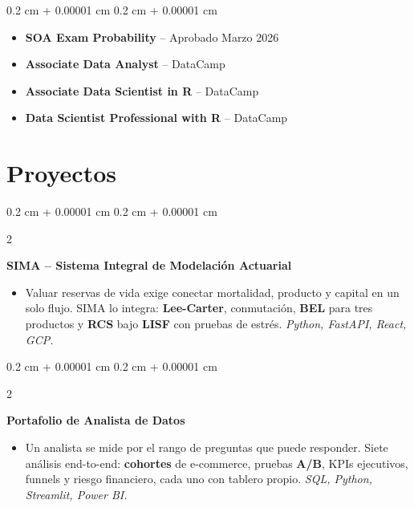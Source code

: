 \documentclass[10pt, letterpaper]{article}
\newenvironment{highlights}{
    \begin{itemize}[
        topsep=0.02 cm,
        parsep=0.05 cm,
        partopsep=0pt,
        itemsep=0pt,
        leftmargin=0.4 cm + 10pt
    ]
}{
    \end{itemize}
}
\newenvironment{highlightsforbulletentries}{
    \begin{itemize}[
        topsep=0.02 cm,
        parsep=0.02 cm,
        partopsep=0pt,
        itemsep=0pt,
        leftmargin=10pt
    ]
}{
    \end{itemize}
}
\newenvironment{onecolentry}{
    \begin{adjustwidth}{
        0.2 cm + 0.00001 cm
    }{
        0.2 cm + 0.00001 cm
    }
}{
    \end{adjustwidth}
}
\newenvironment{twocolentrynarrow}[2][]{
    \onecolentry
    \def\secondColumn{#2}
    \setcolumnwidth{\fill, 2.2 cm}
    \begin{paracol}{2}
}{
    \switchcolumn \raggedleft \secondColumn
    \end{paracol}
    \endonecolentry
}
\newcommand{\hl}[1]{\textcolor{primaryColor}{\textbf{#1}}}
\let\hrefWithoutArrow\href
\renewcommand{\href}[2]{\hrefWithoutArrow{#1}{\ifthenelse{\equal{#2}{}}{ }{#2 }\raisebox{.15ex}{\footnotesize \faExternalLink*}}}
\begin{document}
    \begin{onecolentry}
        \begin{highlightsforbulletentries}
            \item \textbf{SOA Exam Probability} -- Aprobado Marzo 2026 \href{https://drive.google.com/file/d/1rt3emgBnPpQi7NiXkBQeA5WwJTV0JuAf/view?usp=sharing}{}
            \item \textbf{Associate Data Analyst} -- DataCamp \href{https://drive.google.com/drive/folders/1-QUuVH3zPBPsl6RhUvuUWxpZkP1i8TYb?usp=sharing}{}
            \item \textbf{Associate Data Scientist in R} -- DataCamp \href{https://drive.google.com/file/d/1xVLk15A1LBbyXH1fZnd4eBTaJ4d8FLLO/view?usp=drive_link}{}
            \item \textbf{Data Scientist Professional with R} -- DataCamp \href{https://drive.google.com/file/d/1Woe6xqxofloFZ9uM2f5VsdGxY-WQWCRI/view?usp=drive_link}{}
        \end{highlightsforbulletentries}
    \end{onecolentry}


    \section{Proyectos}

\begin{twocolentrynarrow}{\href{https://sima-d3qj5vwxtq-uc.a.run.app}{app live}}
    \textbf{SIMA -- Sistema Integral de Modelación Actuarial}
    \begin{highlights}
        \item Valuar reservas de vida exige conectar mortalidad, producto y capital en un solo flujo. SIMA lo integra: \hl{Lee-Carter}, conmutación, \hl{BEL} para tres productos y \hl{RCS} bajo \hl{LISF} con pruebas de estrés. \textit{Python, FastAPI, React, GCP.}
    \end{highlights}
\end{twocolentrynarrow}

\vspace{0.01 cm}

\begin{twocolentrynarrow}{\href{https://gonorandres.github.io/blog/data-analyst-portfolio/}{blog}}
    \textbf{Portafolio de Analista de Datos}
    \begin{highlights}
        \item Un analista se mide por el rango de preguntas que puede responder. Siete análisis end-to-end: \hl{cohortes} de e-commerce, pruebas \hl{A/B}, KPIs ejecutivos, funnels y riesgo financiero, cada uno con tablero propio. \textit{SQL, Python, Streamlit, Power BI.}
    \end{highlights}
\end{twocolentrynarrow}
\end{document}
